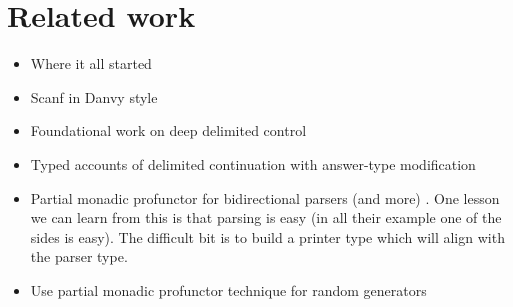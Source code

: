 \documentclass[sigplan,review,dvipsnames,screen,10pt]{acmart}
\begin{document}

\maketitle

\section{Related work}

\begin{itemize}
\item Where it all started \cite{functional-unparsing}
\item Scanf in Danvy style \cite{functional-ununparsing}
\item Foundational work on deep delimited control \cite{shift0}
\item Typed accounts of delimited continuation with answer-type
  modification \cite{polymorphic-conts,substructural-delimcc}
\item Partial monadic profunctor for bidirectional parsers (and more)
  \cite{monadic-profunctors}. One lesson we can learn from this is
  that parsing is easy (in all their example one of the sides is
  easy). The difficult bit is to build a printer type which will align
  with the parser type.
\item Use partial monadic profunctor technique for random generators \cite{reflect-random}
\end{itemize}


{}
\end{document}
